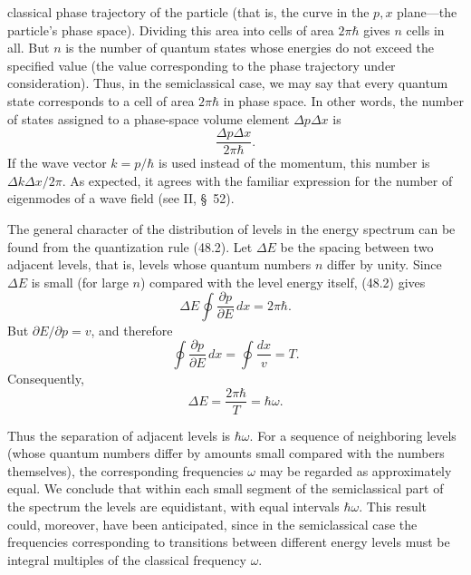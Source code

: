 classical phase trajectory of the particle (that is, the curve in the $p,x$
plane---the particle's phase space). Dividing this area into cells of area
$2\pi\hbar$ gives $n$ cells in all. But $n$ is the number of quantum states
whose energies do not exceed the specified value (the value corresponding to
the phase trajectory under consideration). Thus, in the semiclassical case,
we may say that every quantum state corresponds to a cell of area $2\pi\hbar$
in phase space. In other words, the number of states assigned to a phase-space
volume element $\Delta p\Delta x$ is
\begin{equation}
  \frac{\Delta p\Delta x}{2\pi\hbar}.
  \tag{48.4}
\end{equation}
If the wave vector $k=p/\hbar$ is used instead of the momentum, this number is
$\Delta k\Delta x/2\pi$. As expected, it agrees with the familiar expression
for the number of eigenmodes of a wave field (see II, §~52).

The general character of the distribution of levels in the energy spectrum
can be found from the quantization rule (48.2). Let $\Delta E$ be the spacing
between two adjacent levels, that is, levels whose quantum numbers $n$ differ
by unity. Since $\Delta E$ is small (for large $n$) compared with the level
energy itself, (48.2) gives
\[
  \Delta E\oint\frac{\partial p}{\partial E}\,dx=2\pi\hbar.
\]
But $\partial E/\partial p=v$, and therefore
\[
  \oint\frac{\partial p}{\partial E}\,dx=\oint\frac{dx}{v}=T.
\]
Consequently,
\begin{equation}
  \Delta E=\frac{2\pi\hbar}{T}=\hbar\omega.
  \tag{48.5}
\end{equation}

Thus the separation of adjacent levels is $\hbar\omega$. For a sequence of
neighboring levels (whose quantum numbers differ by amounts small compared
with the numbers themselves), the corresponding frequencies $\omega$ may be
regarded as approximately equal. We conclude that within each small segment
of the semiclassical part of the spectrum the levels are equidistant, with
equal intervals $\hbar\omega$. This result could, moreover, have been
anticipated, since in the semiclassical case the frequencies corresponding to
transitions between different energy levels must be integral multiples of the
classical frequency $\omega$.

